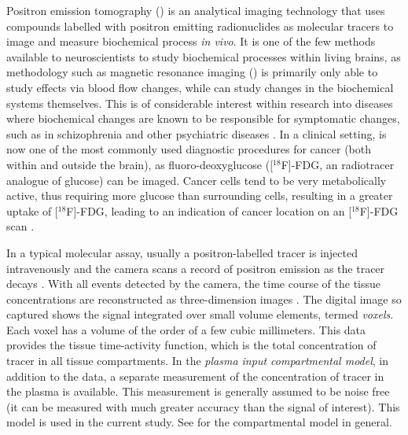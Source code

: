 Positron emission tomography (\pet) is an analytical imaging technology that uses compounds labelled with positron emitting radionuclides as molecular tracers to image and measure biochemical process \emph{in vivo}. It is one of the few methods available to neuroscientists to study biochemical processes within living brains, as methodology such as magnetic resonance imaging (\mri) is primarily only able to study effects via blood flow changes, while \pet can study changes in the biochemical systems themselves. This is of considerable interest within research into diseases where biochemical changes are known to be responsible for symptomatic changes, such as in schizophrenia and other psychiatric diseases \cite{FrankleL2002}. In a clinical setting, \pet is now one of the most commonly used diagnostic procedures for cancer (both within and outside the brain), as fluoro-deoxyglucose ([$^{18}$F]-FDG, an radiotracer analogue of glucose) can be imaged. Cancer cells tend to be very metabolically active, thus requiring more glucose than surrounding cells, resulting in a greater uptake of [$^{18}$F]-FDG, leading to an indication of cancer location on an [$^{18}$F]-FDG scan \cite{Gambhir2002}.

In a typical molecular assay, usually a positron-labelled tracer is injected intravenously and the \pet camera scans a record of positron emission as the tracer decays \cite{Phelps2000}. With all events detected by the \pet camera, the time course of the tissue concentrations are reconstructed as three-dimension images \cite{Kinahan1989}. The digital image so captured shows the signal integrated over small volume elements, termed \emph{voxels}. Each voxel has a volume of the order of a few cubic millimeters. This data provides the tissue time-activity function, which is the total concentration of tracer in all tissue compartments. In the \emph{plasma input compartmental model}, in addition to the \pet data, a separate measurement of the concentration of tracer in the plasma is available. This measurement is generally assumed to be noise free (it can be measured with much greater accuracy than the signal of interest). This model is used in the current study. See \cite{Gunn:2001cx} for the \pet compartmental model in general.

